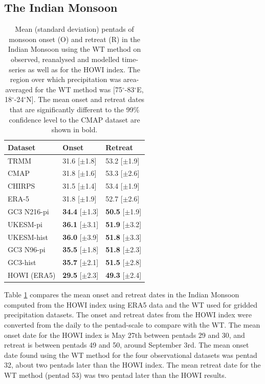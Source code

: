 \subsection{The Indian Monsoon}
\begin{table}[b!]
\caption{Mean (standard deviation) pentads of monsoon onset (O) and retreat (R) in the Indian Monsoon using the WT method on observed, reanalysed and modelled time-series as well as for the HOWI index. The region over which precipitation was area-averaged for the WT method was [75$^\circ$-83$^\circ$E, 18$^\circ$-24$^\circ$N]. The mean onset and retreat dates that are significantly different to the 99\% confidence level to the CMAP dataset are shown in bold.  }
\label{tab:3a}       %
\begin{tabular}{p{4cm}p{3.5cm}p{3.5cm}}
\hline\centering{\smallskip}
Dataset & Onset 	& Retreat 	\\ \hline
TRMM & 31.6 [$\pm$1.8] & 53.2 [$\pm$1.9]   \\
CMAP & 31.8 [$\pm$1.6] & 53.3 [$\pm$2.6]   \\
CHIRPS & 31.5 [$\pm$1.4] & 53.4 [$\pm$1.9]    \\
ERA-5 & 31.8 [$\pm$1.9] & 52.7 [$\pm$2.6]    \\
GC3 N216-pi  & {\bf34.4} [$\pm$1.3] & {\bf 50.5} [$\pm$1.9] \\
UKESM-pi & {\bf36.1} [$\pm$3.1] & {\bf 51.9} [$\pm$3.2]   \\
UKESM-hist & {\bf36.0} [$\pm$3.9] & {\bf51.8} [$\pm$3.3]   \\
GC3 N96-pi & {\bf35.5} [$\pm$1.8] & {\bf51.8} [$\pm$2.3]  \\
GC3-hist & {\bf35.7} [$\pm$2.1] & {\bf51.5} [$\pm$2.8]  \\
HOWI (ERA5) & {\bf29.5} [$\pm$2.3] & {\bf49.3} [$\pm$2.4]
\end{tabular}
\end{table}

Table \ref{tab:3a} compares the mean onset and retreat dates in the Indian Monsoon computed from the HOWI index using ERA5 data and the WT used for gridded precipitation datasets.
The onset and retreat dates from the HOWI index were converted from the daily to the pentad-scale to compare with the WT. The mean onset date for the HOWI index is May 27th between pentads 29 and 30, and retreat is between pentads 49 and 50, around September 3rd. The mean onset date found using the WT method for the four observational datasets was pentad 32, about two pentads later than the HOWI index. The mean retreat date for the WT method (pentad 53) was two pentad later than the HOWI results.

